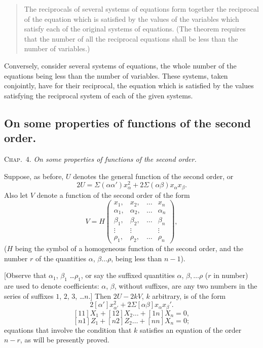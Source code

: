 \documentclass[11pt,a4paper]{book}
\begin{document}
\begin{quote}
The reciprocals of several systems of equations form together the reciprocal of
the equation which is satisfied by the values of the variables which satisfy each of
the original systems of equations. (The theorem requires that the number of all the
reciprocal equations shall be less than the number of variables.)
\end{quote}

Conversely, consider several systems of equations, the whole number of the equations
being less than the number of variables. These systems, taken conjointly, have for
their reciprocal, the equation which is satisfied by the values satisfying the reciprocal
system of each of the given systems.

\newpage
\subsection{On some properties of functions of the second order.}

\textsc{Chap.\ 4.} \textit{On some properties of functions of the second order.}

Suppose, as before, $U$ denotes the general function of the second order, or
\[
2U = \Sigma(\alpha\alpha') x_\alpha^2 + 2\Sigma(\alpha\beta) x_\alpha x_\beta \tag{21}.
\]
Also let $V$ denote a function of the second order of the form
\[
V = H\left(
\begin{array}{cccc}
x_1, & x_2, & \ldots & x_n \\
\alpha_1, & \alpha_2, & \ldots & \alpha_n \\
\beta_1, & \beta_2, & \ldots & \beta_n \\
\vdots & \vdots & & \vdots \\
\rho_1, & \rho_2, & \ldots & \rho_n
\end{array}
\right)
\tag{22},
\]
($H$ being the symbol of a homogeneous function of the second order, and the number
$r$ of the quantities $\alpha$, $\beta \ldots \rho$, being less than $n-1$).

[Observe that $\alpha_1$, $\beta_1$ \ldots $\rho_1$, or say the suffixed quantities $\alpha$, $\beta, \ldots \rho$ ($r$ in number) are used to denote
coefficients: $\alpha$, $\beta$, without suffixes, are any two numbers in the series of suffixes
$1$, $2$, $3$, \ldots $n$.] Then $2U - 2kV$, $k$ arbitrary, is of the form
\[
2[\alpha'] x_{\alpha'}^2 + 2\Sigma[\alpha\beta] x_\alpha x_\beta' \tag{23}.
\]
\[
[11] X_1 + [12] X_2 \ldots + [1n] X_n = 0,
\]
\[
[n1] Z_1 + [n2] Z_2 \ldots + [nn] X_n = 0;
\]
equations that involve the condition that $k$ satisfies an equation of the order $n-r$, as
will be presently proved.
\end{document}
